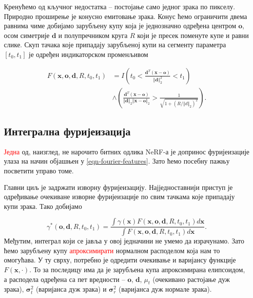\documentclass[12pt, a4paper, twoside]{book}
\numberwithin{equation}{chapter}
\numberwithin{theorem}{section}
\numberwithin{definition}{section}
\numberwithin{definitionChapter}{chapter}
\begin{document}
Кренућемо од кључног недостатка -- постојање само једног зрака по пикселу. Природно проширење
је конусно емитовање зрака. Конус ћемо ограничити двема равнима чиме добијамо зарубљену купу
која је једнозначно одређена центром $\mathbf{o}$, осом симетрије $\mathbf{d}$ и полупречником
круга $R$ који је пресек поменуте купе и равни слике. Скуп тачака које припадају зарубљеној купи
на сегменту параметра $\left[t_0, t_1\right]$ је одређен индикаторском променљивом

\begin{equation}
	\begin{split}
		F(\mathbf{x}, \mathbf{o}, \mathbf{d}, R, t_0, t_1) & =
			I \left(t_0 < \frac{\mathbf{d}^T(\mathbf{x} - \mathbf{o})}{\left\Vert\mathbf{d}\right\Vert^2_2} < t_1 \right) \\
			& \land
			\left(
				\frac{\mathbf{d}^T(\mathbf{x} - \mathbf{o})}
				{\left\Vert\mathbf{d}\right\Vert_2 \left\Vert \mathbf{x} - \mathbf{o}\right\Vert_2}
				> \frac{1}{\sqrt{1 + (R / \left\Vert d\right\Vert_2)^2}}
			\right).
	\end{split}
\end{equation}

\subsection{Интегрална фуријеизација}
\textcolor{red}{Једна} од, наизглед, не нарочито битних одлика NeRF-а је допринос фуријеизације улаза на начин
објашњен у \ref{eqn-fourier-features}. Зато ћемо посебну пажњу посветити управо томе.

Главни циљ је задржати изворну фуријеизацију. Најједноставнији приступ је одређивање очекиване
изворне фуријеизације по свим тачкама које припадају купи зрака. Тако добијамо

\begin{equation}
	\gamma^{*}(\mathbf{o}, \mathbf{d}, R, t_0, t_1)
		= \frac{\int\gamma(\mathbf{x})F(\mathbf{x}, \mathbf{o}, \mathbf{d}, R, t_0, t_1)d\mathbf{x}}
				{\int F(\mathbf{x}, \mathbf{o}, \mathbf{d}, R, t_0, t_1)d\mathbf{x}}.
	\label{eqn-ipe-raw}
\end{equation}
Међутим, интеграл који се јавља у овој једначини не умемо да израчунамо. Зато ћемо зарубљену купу
\textcolor{red}{апроксимирати} нормалном расподелом која нам то омогућава. У ту сврху, потребно је одредити
очекивање и варијансу функције $F(\mathbf{x}, \cdot)$. То за последицу има да је зарубљена купа
апроксимирана елипсоидом, а расподела одређена са пет вредности -- $\mathbf{o}$,
$\mathbf{d}$, $\mu_t$ (очекивано растојање дуж зрака), $\mathbf{\sigma}^2_t$ (варијанса дуж зрака) и
$\mathbf{\sigma}^2_r$ (варијанса дуж нормале зрака).
\end{document}
